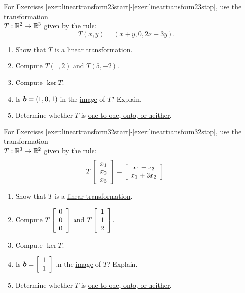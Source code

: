 
\setlength{\columnseprule}{0.4pt}
\begin{multicols}{2}
\noindent For Exercises \ref{exer:lineartransform23start}-\ref{exer:lineartransform23stop}, use the transformation\\ $T : \R^2 \to \R^3$ given by the rule:
\[T(x,y) = (x+y, 0, 2x+3y).\]
\begin{enumerate}[!HW!, start=1, label=$\spadesuit$ \arabic*., ref=\arabic*]
\item\label{exer:lineartransform23start} Show that $T$ is a \hyperref[def:linear]{linear transformation}.
\item Compute $T(1, 2)$ and $T(5,-2)$.
\item Compute \hyperref[def:linear]{$\ker T$}.
\item Is $\bb b = (1,0,1)$ in the \hyperref[def:linear]{image} of $T$? Explain. 
\item\label{exer:lineartransform23stop} Determine whether $T$ is \hyperref[def:injective]{one-to-one, onto, or neither}.
\end{enumerate}\columnbreak

\noindent For Exercises \ref{exer:lineartransform32start}-\ref{exer:lineartransform32stop}, use the transformation\\ $T : \R^3 \to \R^2$ given by the rule:
\[T\vr{x_1\\x_2\\x_3} = \mtx{c}{x_1+x_3\\x_1+3x_2}.\]
\begin{enumerate}[!HW!]
\item\label{exer:lineartransform32start} Show that $T$ is a \hyperref[def:linear]{linear transformation}.
\item Compute $T\vr{0\\0\\0}$ and $T\vr{1\\1\\2}$.
\item Compute \hyperref[def:linear]{$\ker T$}.
\item Is $\bb b = \vr{1\\1}$ in the \hyperref[def:linear]{image} of $T$? Explain. 
\item\label{exer:lineartransform32stop} Determine whether $T$ is \hyperref[def:injective]{one-to-one, onto, or neither}.
\end{enumerate}
\end{multicols}\vspace{5 pt}

